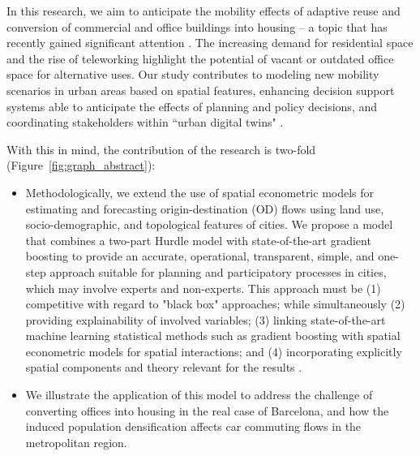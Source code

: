 In this research, we aim to anticipate the mobility effects of adaptive reuse \citep{Remy2014, Pratiwi2023} and conversion of commercial and office buildings into housing -- a topic that has recently gained significant attention \citep{EYStrategyandTransactions2023The2023, AjuntamentdeBarcelona2024, Frei2023a, Schneebeli2021a, Rohwetter, Tagesschau, Bloomberg2021a, Meyer2024a}. 
The increasing demand for residential space and the rise of teleworking highlight the potential of vacant or outdated office space for alternative uses. Our study contributes to modeling new mobility scenarios in urban areas based on spatial features, enhancing decision support systems \citep{Geertman2012PlanningScience} able to anticipate the effects of planning and policy decisions, and coordinating stakeholders within ``urban digital twins" \citep{Batty2018, Bettencourt2024RecentTwins}. 

With this in mind, the contribution of the research is two-fold (Figure~\ref{fig:graph_abstract}):
\begin{itemize}
    \item Methodologically, we extend the use of spatial econometric models for estimating and forecasting origin-destination (OD) flows using land use, socio-demographic, and topological features of cities. We propose a model that combines a two-part Hurdle model with state-of-the-art gradient boosting \citep{Friedman2001GreedyMachine.} to provide an accurate, operational, transparent, simple, and one-step approach suitable for planning and participatory processes in cities, which may involve experts and non-experts. This approach must be (1) competitive with regard to "black box" approaches; while simultaneously (2) providing explainability of involved variables; (3) linking state-of-the-art machine learning statistical methods such as gradient boosting with spatial econometric models for spatial interactions; and (4) incorporating explicitly spatial components and theory relevant for the results \citep{Credit2022SpatialAngeles,Singleton2021GeographicScience}. 
    \item We illustrate the application of this model to address the challenge of converting offices into housing in the real case of Barcelona, and how the induced population densification affects car commuting flows in the metropolitan region.
\end{itemize}

